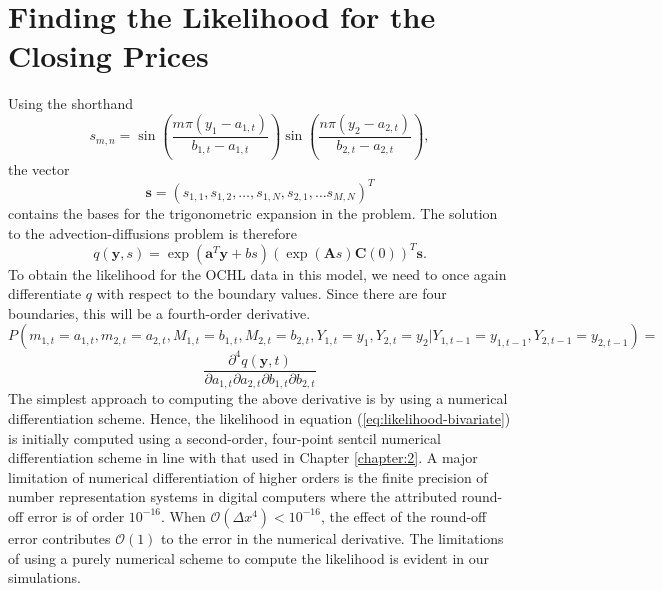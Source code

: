 \section{Finding the Likelihood for the Closing Prices}
Using the shorthand 
\[ s_{m,n} = \sin\left( \frac{m \pi (y_1 - a_{1,t})}{b_{1,t} - a_{1,t}} \right) \sin\left( \frac{n \pi (y_2 - a_{2,t})}{b_{2,t} - a_{2,t}} \right), \]
the vector
\[ \mathbf{s} = ( s_{1,1}, s_{1,2}, \ldots, s_{1,N}, s_{2,1}, \ldots s_{M,N} )^T \]
contains the bases for the trigonometric expansion in the problem. The solution to the advection-diffusions problem is therefore 
\[ 
	q(\mathbf{y}, s) = \exp(\mathbf{a}^T \mathbf{y} + bs)( \exp(\mathbf{A} s) \mathbf{C}(0))^T \mathbf{s}. 
\]
To obtain the likelihood for the OCHL data in this model, we need to once again differentiate $q$ with respect to the boundary values. Since there are four boundaries, this will be a fourth-order derivative.
%
\[ 
P(m_{1,t} = a_{1,t}, m_{2,t} = a_{2,t}, M_{1,t} = b_{1,t}, M_{2,t} = b_{2,t}, Y_{1,t} = y_1, Y_{2,t} = y_2 |Y_{1,t-1}=y_{1,t-1}, Y_{2,t-1}=y_{2,t-1} )  =  
\]
%
\begin{equation} 
\frac{\partial^4 q(\mathbf{y}, t)}{\partial a_{1,t} \partial a_{2,t} \partial b_{1,t} \partial b_{2,t} } \label{eq:likelihood-bivariate}
\end{equation}
%
The simplest approach to computing the above derivative is by using a numerical differentiation scheme. Hence, the likelihood in equation (\ref{eq:likelihood-bivariate}) is initially computed using a second-order, four-point sentcil numerical differentiation scheme in line with that used in Chapter \ref{chapter:2}. A major limitation of numerical differentiation of higher orders is the finite precision of number representation systems in digital computers where the attributed round-off error is of order $10^{-16}$. When $\mathcal{O}(\Delta x^4) < 10^{-16}$, the effect of the round-off error contributes $\mathcal{O}(1)$ to the error in the numerical derivative. The limitations of using a purely numerical scheme to compute the likelihood is evident in our simulations. 

